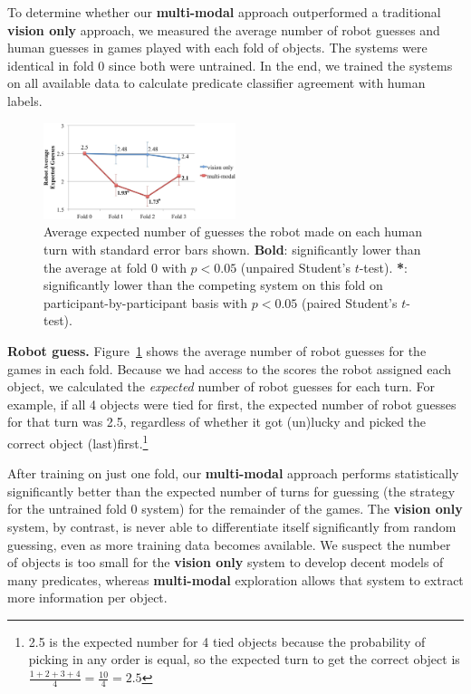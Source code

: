 To determine whether our \textbf{multi-modal} approach outperformed a traditional \textbf{vision only} approach, we measured the average number of robot guesses and human guesses in games played with each fold of objects.
The systems were identical in fold 0 since both were untrained.
In the end, we trained the systems on all available data to calculate predicate classifier agreement with human labels.

\begin{figure}
\centering
\includegraphics[width=0.5\textwidth]{figures/robot_guesses_error_bars.jpg}
\caption{Average expected number of guesses the robot made on each human turn with standard error bars shown.
\textbf{Bold}: significantly lower than the average at fold 0 with $p<0.05$ (unpaired Student's $t$-test).
\textbf{*}: significantly lower than the competing system on this fold on participant-by-participant basis with $p<0.05$ (paired Student's $t$-test).}
\label{fig:robot_guesses}
\end{figure}

\textbf{Robot guess.} Figure~\ref{fig:robot_guesses} shows the average number of robot guesses for the games in each fold. Because we had access to the scores the robot assigned each object, we calculated the {\it expected} number of robot guesses for each turn.
For example, if all 4 objects were tied for first, the expected number of robot guesses for that turn was 2.5, regardless of whether it got (un)lucky and picked the correct object (last)first.\footnote{2.5 is the expected number for 4 tied objects because the probability of picking in any order is equal, so the expected turn to get the correct object is $\frac{1+2+3+4}{4} = \frac{10}{4} = 2.5$}

After training on just one fold, our \textbf{multi-modal} approach performs statistically significantly better than the expected number of turns for guessing (the strategy for the untrained fold 0 system) for the remainder of the games.
The \textbf{vision only} system, by contrast, is never able to differentiate itself significantly from random guessing, even as more training data becomes available.
We suspect the number of objects is too small for the \textbf{vision only} system to develop decent models of many predicates, whereas \textbf{multi-modal} exploration allows that system to extract more information per object.

